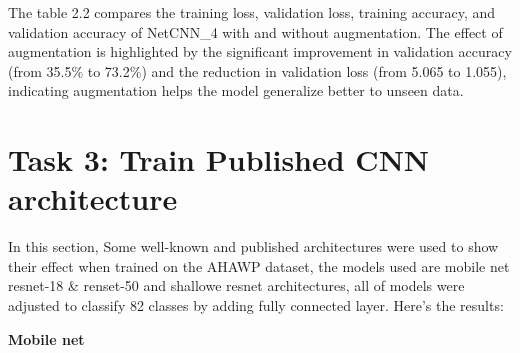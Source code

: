 \documentclass[12pt]{article}
\begin{document}
The table 2.2 compares the training loss, validation loss, training accuracy, and validation accuracy of NetCNN\_4 with and without augmentation. The effect of augmentation is highlighted by the significant improvement in validation accuracy (from 35.5\% to 73.2\%) and the reduction in validation loss (from 5.065 to 1.055), indicating augmentation helps the model generalize better to unseen data.




\section*{Task 3: Train Published CNN architecture}
In this section, Some well-known and published architectures were used to show their effect when trained on the AHAWP dataset, the models used are mobile net resnet-18 \& renset-50 and shallowe resnet architectures, all of models were adjusted to classify 82 classes by adding fully connected layer. Here's the results:

\textbf{Mobile net}
\end{document}
